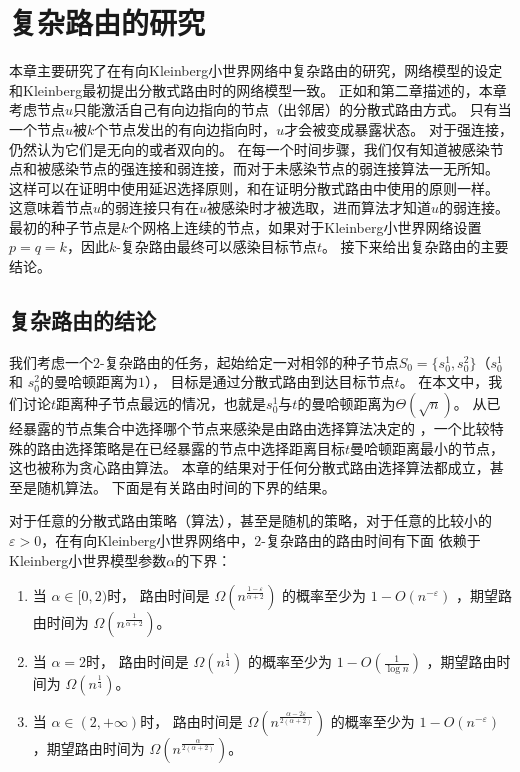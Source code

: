 \chapter{复杂路由的研究}

\def \doubleto {\stackrel{ \geq 2}{\longrightarrow}}

本章主要研究了在有向Kleinberg小世界网络中复杂路由的研究，网络模型的设定和Kleinberg最初提出分散式路由时的网络模型一致。
正如和第二章描述的，本章考虑节点$u$只能激活自己有向边指向的节点（出邻居）的分散式路由方式。
只有当一个节点$u$被$k$个节点发出的有向边指向时，$u$才会被变成暴露状态。
对于强连接，仍然认为它们是无向的或者双向的。
在每一个时间步骤，我们仅有知道被感染节点和被感染节点的强连接和弱连接，而对于未感染节点的弱连接算法一无所知。
这样可以在证明中使用延迟选择原则，和在证明分散式路由中使用的原则一样。
这意味着节点$u$的弱连接只有在$u$被感染时才被选取，进而算法才知道$u$的弱连接。
最初的种子节点是$k$个网格上连续的节点，如果对于Kleinberg小世界网络设置$p = q = k$，因此$k$-复杂路由最终可以感染目标节点$t$。
接下来给出复杂路由的主要结论。

\section{复杂路由的结论} \label{sec:routing}

我们考虑一个$2$-复杂路由的任务，起始给定一对相邻的种子节点$S_0 = \{s_0^1, s_0^2\}$（$s_0^1$ 和 $s_0^2$的曼哈顿距离为$1$），
目标是通过分散式路由到达目标节点$t$。
在本文中，我们讨论$t$距离种子节点最远的情况，也就是$s_0^1$与$t$的曼哈顿距离为$\Theta(\sqrt{n})$。
从已经暴露的节点集合中选择哪个节点来感染是由路由选择算法决定的
，一个比较特殊的路由选择策略是在已经暴露的节点中选择距离目标$t$曼哈顿距离最小的节点，这也被称为贪心路由算法。
本章的结果对于任何分散式路由选择算法都成立，甚至是随机算法。
下面是有关路由时间的下界的结果。



\begin{theorem}\label{thm:routing}
对于任意的分散式路由策略（算法），甚至是随机的策略，对于任意的比较小的$\varepsilon > 0$，在有向Kleinberg小世界网络中，$2$-复杂路由的路由时间有下面
依赖于Kleinberg小世界模型参数$\alpha$的下界：


\begin{enumerate}
\item
当 $\alpha\in [0,2)$时， 路由时间是 $\Omega( n^{\frac{1-\varepsilon}{\alpha + 2}})$ 的概率至少为 $1-O(n^{-\varepsilon})$ 
，期望路由时间为 $\Omega( n^{\frac{1}{\alpha + 2}})$。
\item
当 $\alpha = 2$时， 路由时间是 $\Omega(n^{\frac{1}{4}})$ 的概率至少为 $1-O(\frac{1}{\log n})$ 
，期望路由时间为 $\Omega(n^{\frac{1}{4}})$。
\item
当 $\alpha\in (2,+\infty)$时， 路由时间是 $\Omega( n^{\frac{\alpha-2\varepsilon}{2(\alpha+2)}})$ 的概率至少为 $1-O(n^{-\varepsilon})$ 
，期望路由时间为 $\Omega( n^{\frac{\alpha}{2(\alpha+2)}})$。

\end{enumerate}
\end{theorem}

